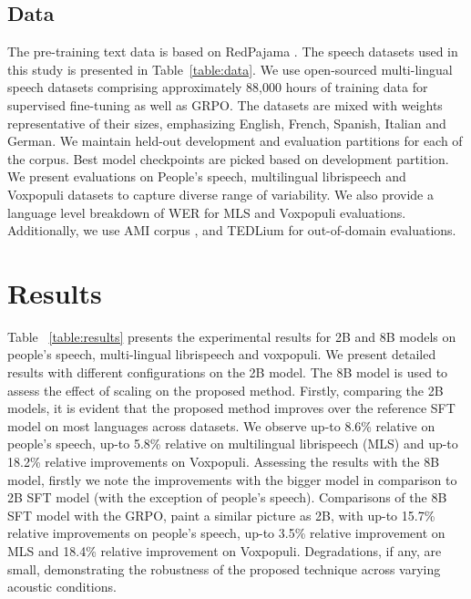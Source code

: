 \documentclass[conference]{IEEEtran}
\begin{document}
\subsection{Data}
The pre-training text data is based on RedPajama \cite{together2023redpajama}.
The speech datasets used in this study is presented in Table~\ref{table:data}.
We use open-sourced multi-lingual speech datasets comprising approximately 88,000 hours of training data for supervised fine-tuning as well as GRPO.
The datasets are mixed with weights representative of their sizes, emphasizing English, French, Spanish, Italian and German.
We maintain held-out development and evaluation partitions for each of the corpus.
Best model checkpoints are picked based on development partition.
We present evaluations on People's speech, multilingual librispeech and Voxpopuli datasets to capture diverse range of variability.
We also provide a language level breakdown of WER for MLS and Voxpopuli evaluations.
Additionally, we use AMI corpus \cite{carletta2005ami}, and TEDLium \cite{hernandez2018ted} for out-of-domain evaluations.

\section{Results}\label{sec:results}

Table ~\ref{table:results} presents the experimental results for 2B and 8B models on people's speech, multi-lingual librispeech and voxpopuli.
We present detailed results with different configurations on the 2B model.
The 8B model is used to assess the effect of scaling on the proposed method.
Firstly, comparing the 2B models, it is evident that the proposed method improves over the reference SFT model on most languages across datasets.
We observe up-to 8.6\% relative on people's speech, up-to 5.8\% relative on multilingual librispeech  (MLS) and up-to 18.2\% relative improvements on Voxpopuli.
Assessing the results with the 8B model, firstly we note the improvements with the bigger model in comparison to 2B SFT model (with the exception of people's speech).
Comparisons of the 8B SFT model with the GRPO, paint a similar picture as 2B, with up-to 15.7\% relative improvements on people's speech, up-to 3.5\% relative improvement on MLS and 18.4\% relative improvement on Voxpopuli.
Degradations, if any, are small, demonstrating the robustness of the proposed technique across varying acoustic conditions.
\end{document}
